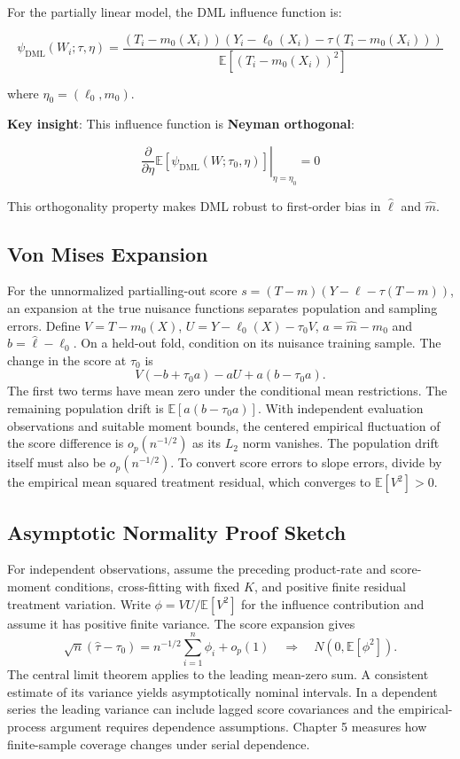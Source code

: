 For the partially linear model, the DML influence function is:

\[\psi_{\text{DML}}(W_i; \tau, \eta) = \frac{(T_i - m_0(X_i))(Y_i - \ell_0(X_i) - \tau(T_i - m_0(X_i)))}{\mathbb{E}[(T_i - m_0(X_i))^2]}\]

where \(\eta_0 = (\ell_0, m_0)\).

\textbf{Key insight}: This influence function is \textbf{Neyman
orthogonal}:

\[\left. \frac{\partial}{\partial \eta} \mathbb{E}[\psi_{\text{DML}}(W; \tau_0, \eta)] \right|_{\eta = \eta_0} = 0\]

This orthogonality property makes DML robust to first-order bias in
\(\hat{\ell}\) and \(\hat{m}\).

\subsection{Von Mises Expansion}\label{_von_mises_expansion}

For the unnormalized partialling-out score \(s=(T-m)(Y-\ell-\tau(T-m))\), an expansion at the true nuisance functions separates population and sampling errors. Define \(V=T-m_0(X)\), \(U=Y-\ell_0(X)-\tau_0V\), \(a=\widehat m-m_0\) and \(b=\widehat\ell-\ell_0\). On a held-out fold, condition on its nuisance training sample. The change in the score at \(\tau_0\) is
\[
V(-b+\tau_0a)-aU+a(b-\tau_0a).
\]
The first two terms have mean zero under the conditional mean restrictions. The remaining population drift is \(\mathbb E[a(b-\tau_0a)]\). With independent evaluation observations and suitable moment bounds, the centered empirical fluctuation of the score difference is \(o_p(n^{-1/2})\) as its \(L_2\) norm vanishes. The population drift itself must also be \(o_p(n^{-1/2})\). To convert score errors to slope errors, divide by the empirical mean squared treatment residual, which converges to \(\mathbb E[V^2]>0\).

\subsection{Asymptotic Normality Proof
Sketch}\label{_asymptotic_normality_proof_sketch}

For independent observations, assume the preceding product-rate and score-moment conditions, cross-fitting with fixed \(K\), and positive finite residual treatment variation. Write \(\phi=VU/\mathbb E[V^2]\) for the influence contribution and assume it has positive finite variance. The score expansion gives
\[
\sqrt{n}(\widehat\tau-\tau_0)=n^{-1/2}\sum_{i=1}^n\phi_i+o_p(1)
\quad\Longrightarrow\quad N(0,\mathbb E[\phi^2]).
\]
The central limit theorem applies to the leading mean-zero sum. A consistent estimate of its variance yields asymptotically nominal intervals. In a dependent series the leading variance can include lagged score covariances and the empirical-process argument requires dependence assumptions. Chapter 5 measures how finite-sample coverage changes under serial dependence.


